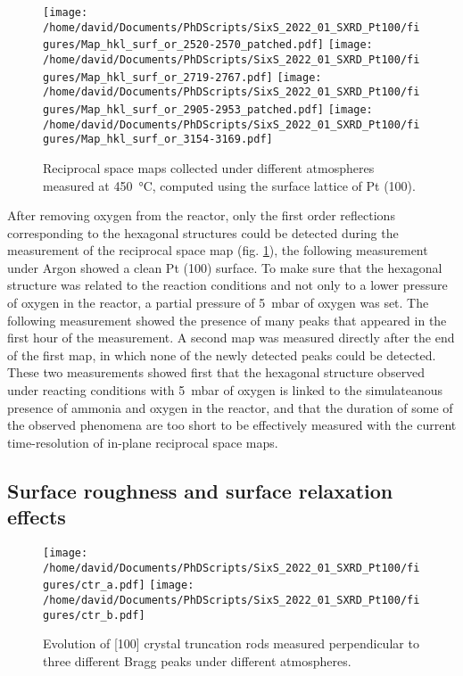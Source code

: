\begin{figure}[!htb]
    \centering
    \texttt{[image: /home/david/Documents/PhDScripts/SixS\_2022\_01\_SXRD\_Pt100/figures/Map\_hkl\_surf\_or\_2520-2570\_patched.pdf]}
    \texttt{[image: /home/david/Documents/PhDScripts/SixS\_2022\_01\_SXRD\_Pt100/figures/Map\_hkl\_surf\_or\_2719-2767.pdf]}
    \texttt{[image: /home/david/Documents/PhDScripts/SixS\_2022\_01\_SXRD\_Pt100/figures/Map\_hkl\_surf\_or\_2905-2953\_patched.pdf]}
    \texttt{[image: /home/david/Documents/PhDScripts/SixS\_2022\_01\_SXRD\_Pt100/figures/Map\_hkl\_surf\_or\_3154-3169.pdf]}
    \caption{
        Reciprocal space maps collected under different atmospheres measured at \qty{450}{\degreeCelsius}, computed using the surface lattice of Pt (100).
    }
    \label{fig:MapsPt100C}
\end{figure}

After removing oxygen from the reactor, only the first order reflections corresponding to the hexagonal structures could be detected during the measurement of the reciprocal space map (fig. \ref{fig:MapsPt100C}), the following measurement under Argon showed a clean Pt (100) surface.
To make sure that the hexagonal structure was related to the reaction conditions and not only to a lower pressure of oxygen in the reactor, a partial pressure of \qty{5}{\milli\bar} of oxygen was set.
The following measurement showed the presence of many peaks that appeared in the first hour of the measurement.
A second map was measured directly after the end of the first map, in which none of the newly detected peaks could be detected.
These two measurements showed first that the hexagonal structure observed under reacting conditions with \qty{5}{\milli\bar} of oxygen is linked to the simulateanous presence of ammonia and oxygen in the reactor, and that the duration of some of the observed phenomena are too short to be effectively measured with the current time-resolution of in-plane reciprocal space maps.

\subsection{Surface roughness and surface relaxation effects}

\begin{figure}[!htb]
    \centering
    \texttt{[image: /home/david/Documents/PhDScripts/SixS\_2022\_01\_SXRD\_Pt100/figures/ctr\_a.pdf]}
    \texttt{[image: /home/david/Documents/PhDScripts/SixS\_2022\_01\_SXRD\_Pt100/figures/ctr\_b.pdf]}
    \caption{
        Evolution of [100] crystal truncation rods measured perpendicular to three different Bragg peaks under different atmospheres.
    }
    \label{fig:CTRPt100}
\end{figure}

